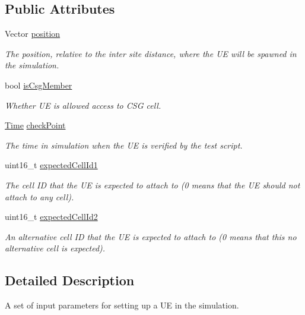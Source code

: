 \subsection*{Public Attributes}
\begin{DoxyCompactItemize}
\item 
Vector \hyperlink{structLteCellSelectionTestCase_1_1UeSetup__t_a022f57e5d3a6de3021110f2c646fe9fe}{position}
\begin{DoxyCompactList}\small\item\em The position, relative to the inter site distance, where the UE will be spawned in the simulation. \end{DoxyCompactList}\item 
bool \hyperlink{structLteCellSelectionTestCase_1_1UeSetup__t_a86d14f555665658a506313e5e7613267}{is\+Csg\+Member}
\begin{DoxyCompactList}\small\item\em Whether UE is allowed access to C\+SG cell. \end{DoxyCompactList}\item 
\hyperlink{classns3_1_1Time}{Time} \hyperlink{structLteCellSelectionTestCase_1_1UeSetup__t_aeb15c381f72d6800f421bead43ad16bb}{check\+Point}
\begin{DoxyCompactList}\small\item\em The time in simulation when the UE is verified by the test script. \end{DoxyCompactList}\item 
uint16\+\_\+t \hyperlink{structLteCellSelectionTestCase_1_1UeSetup__t_a54e1f0460b1f6523099aec77d8888d4d}{expected\+Cell\+Id1}
\begin{DoxyCompactList}\small\item\em The cell ID that the UE is expected to attach to (0 means that the UE should not attach to any cell). \end{DoxyCompactList}\item 
uint16\+\_\+t \hyperlink{structLteCellSelectionTestCase_1_1UeSetup__t_a44ed53e08ab981aefba7dc11ac9210a3}{expected\+Cell\+Id2}
\begin{DoxyCompactList}\small\item\em An alternative cell ID that the UE is expected to attach to (0 means that this no alternative cell is expected). \end{DoxyCompactList}\end{DoxyCompactItemize}


\subsection{Detailed Description}
A set of input parameters for setting up a UE in the simulation. 

